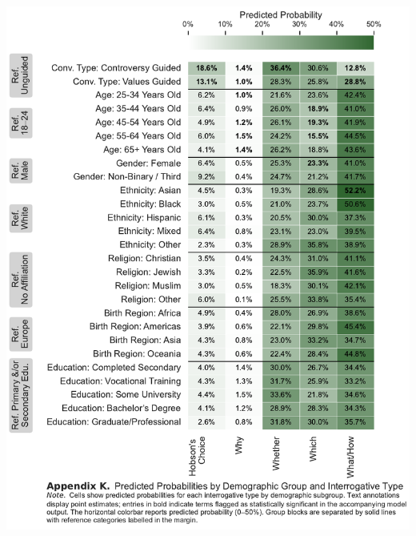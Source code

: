 \documentclass[
  12pt,
]{article}
\begin{document}
\begin{center}\includegraphics{../03_outputs/02_descriptive_analyses/appendix_k} \end{center}
\end{document}
